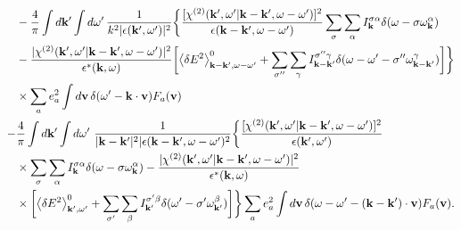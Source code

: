 \documentclass[10pt,aspectratio=1610,lualatex]{beamer}
\begin{document}
\begin{frame}[noframenumbering]
  \begin{displaymath}
    \begin{split}
      &-\frac{4}{\pi}\int d{\bf k '} \int d\omega '\,
      \frac{1}{k^2|\epsilon({\bf k'},\omega ')|^2}\biggl\{
      \frac{[\chi^{(2)}({\bf k'},\omega '|{\bf k-k'},\omega
	-\omega ')]^2}{\epsilon({\bf k - k'},\omega-\omega ')}
      \sum_{\sigma}\sum_{\alpha}I_{\bf k}^{\sigma \alpha}
      \delta(\omega-\sigma \omega_{\bf k}^\alpha)\\
      &-\frac{|\chi^{(2)}({\bf k'},\omega '|{\bf k-k'},\omega-\omega ')|^2}
      {\epsilon^*({\bf k},\omega)}\biggl[
      \left< \delta E^2 \right>_{{\bf k - k'},\omega-\omega '}^0
      +\sum_{\sigma ''}\sum_{\gamma}I_{\bf k -k'}^{\sigma '' \gamma}
      \delta(\omega-\omega ' -\sigma '' \omega_{\bf k -k'}^\gamma)
      \biggr]\biggr\}\\
      &\times\sum_ae_a^2\int d{\bf v}\,
      \delta(\omega '-{\bf k \cdot v})F_a({\bf v})\\
      -&\frac{4}{\pi}\int d{\bf k '} \int d\omega '\
      \frac{1}{|{\bf k - k'}|^2|\epsilon({\bf k-k'},\omega-\omega ')^2}
      \biggl\{ \frac{[\chi^{(2)}({\bf k'},\omega '|{\bf k-k'},\omega
	-\omega ')]^2}{\epsilon({\bf k'},\omega ')}\\
      &\times\sum_{\sigma}\sum_{\alpha} I_{\bf k}^{\sigma \alpha}
      \delta(\omega-\sigma \omega_{\bf k}^\alpha)
      -\frac{|\chi^{(2)}({\bf k'},\omega '|{\bf k-k'},\omega-\omega ')|^2}
      {\epsilon^*({\bf k},\omega)}\\
      &\times \biggl[\left< \delta E^2 \right>_{{\bf k'},\omega '}^0
      +\sum_{\sigma '}\sum_{\beta}I_{\bf k'}^{\sigma ' \beta}
      \delta(\omega '-\sigma ' \omega_{\bf k'}^\beta)\biggr]\biggr\}
      \sum_a e_a^2\int d{\bf v}\,
      \delta(\omega-\omega '-{\bf (k-k')\cdot v})F_a({\bf v}).
    \end{split}
  \end{displaymath}
\end{frame}
\end{document}
